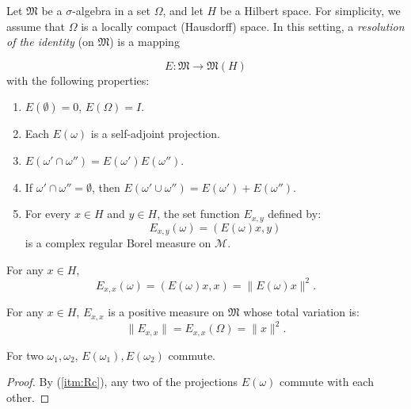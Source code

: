 \begin{definition}[12.17]
  Let $\mathfrak{M}$ be a $\sigma$-algebra in a set $\Omega$, and let $H$ be a Hilbert space.
  For simplicity, we assume that $\Omega$ is a locally compact (Hausdorff) space.
  In this setting, a \emph{resolution of the identity} (on $\mathfrak{M}$) is a mapping

  \[
    E: \mathfrak{M} \to \mathfrak{M}(H)
  \]
  with the following properties:

  \begin{enumerate}
    \item \label{itm:Ra} \( E(\emptyset) = 0\), \(E(\Omega) = I\).
    \item \label{itm:Rb}  Each \( E(\omega) \) is a self-adjoint projection.
    \item \label{itm:Rc} \( E(\omega' \cap \omega'') = E(\omega')E(\omega'')\).
    \item \label{itm:Rd}  If \( \omega' \cap \omega'' = \emptyset \), then \( E(\omega' \cup \omega'') = E(\omega') + E(\omega'') \).
    \item \label{itm:Re}  For every \( x \in H \) and \( y \in H \), the set function \( E_{x,y} \) defined by:
          \[
            E_{x,y}(\omega) = (E(\omega)x, y)
          \]
          is a complex regular Borel measure on \( \mathcal{M} \).
  \end{enumerate}
\end{definition}


\begin{lemma}
 For any $x \in H$,
 \[
  E_{x,x}(\omega) = (E(\omega)x, x) = \|E(\omega)x\|^2.
 \]
\end{lemma}

\begin{lemma}
 For any $x \in H$,
 \( E_{x,x} \) is a positive measure on \( \mathfrak{M} \) whose total variation is:
 \[
  \|E_{x,x}\| = E_{x,x}(\Omega) = \|x\|^2.
 \]
\end{lemma}

\begin{lemma}
 For two $\omega_1, \omega_2$, \( E(\omega_1), E(\omega_2) \) commute.
\end{lemma}
\begin{proof}
 By (\ref{itm:Rc}), any two of the projections \( E(\omega) \) commute with each other.
\end{proof}

